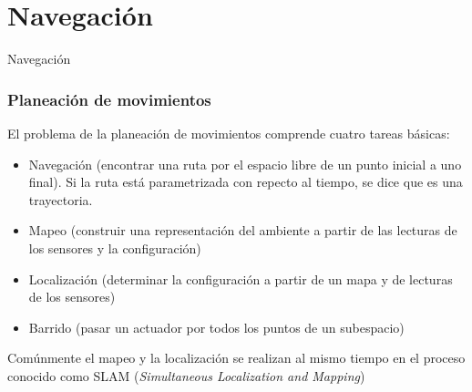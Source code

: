 \section[Navegación]{Navegación}

\begin{frame}
  \Huge
  Navegación
\end{frame}

\begin{frame}\frametitle{Planeación de movimientos}
  El problema de la planeación de movimientos comprende cuatro tareas básicas:
  \begin{itemize}
  \item Navegación (encontrar una ruta por el espacio libre de un punto inicial a uno final). Si la ruta está parametrizada con repecto al tiempo, se dice que es una trayectoria.
  \item Mapeo (construir una representación del ambiente a partir de las lecturas de los sensores y la configuración)
  \item Localización (determinar la configuración a partir de un mapa y de lecturas de los sensores)
  \item Barrido (pasar un actuador por todos los puntos de un subespacio)
  \end{itemize}
  Comúnmente el mapeo y la localización se realizan al mismo tiempo en el proceso conocido como SLAM (\textit{Simultaneous Localization and Mapping})
\end{frame}

